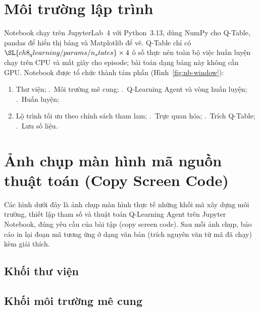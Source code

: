 \section{Môi trường lập trình}
Notebook chạy trên JupyterLab~4 với Python~3.13, dùng NumPy cho Q-Table, pandas để hiển thị bảng và Matplotlib để vẽ.
Q-Table chỉ có $\SL{ch8_qlearning/params/n_states} \times 4$ ô số thực nên toàn bộ việc huấn luyện chạy trên CPU và mất
 giây cho  episode; bài toán dạng bảng này không
cần GPU. Notebook được tổ chức thành tám phần (Hình~\ref{fig:nb-window}):
\begin{enumerate}
  \item Thư viện; .~Môi trường mê cung; .~Q-Learning Agent và vòng huấn luyện; .~Huấn luyện;
  \setcounter{enumi}{4}
  \item Lộ trình tối ưu theo chính sách tham lam; .~Trực quan hóa; .~Trích Q-Table;
        .~Lưu số liệu.
\end{enumerate}


\section{Ảnh chụp màn hình mã nguồn thuật toán (Copy Screen Code)}
Các hình dưới đây là ảnh chụp màn hình thực tế những khối mã xây dựng môi trường, thiết lập tham số và thuật toán
Q-Learning Agent trên Jupyter Notebook, đúng yêu cầu của bài tập (copy screen code). Sau mỗi ảnh chụp, báo cáo in lại
đoạn mã tương ứng ở dạng văn bản (trích nguyên văn từ mã đã chạy) kèm giải thích.

\subsection{Khối thư viện}

\subsection{Khối môi trường mê cung}

